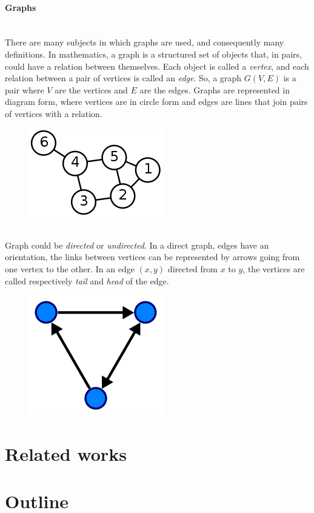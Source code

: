 \paragraph{Graphs}\
\\
There are many subjects in which graphs are used, and consequently many definitions. In mathematics, a graph is a structured set of objects that, in pairs, could have a relation between themselves. Each object is called a \textit{vertex}, and each relation between a pair of vertices is called an \textit{edge}. So, a graph $ G(V,E) $ is a pair where $ V $ are the vertices and $ E $ are the edges. Graphs are represented in diagram form, where vertices are in circle form and edges are lines that join pairs of vertices with a relation.
\begin{figure}[htbp]
	\centering
	\includegraphics[scale=0.5]{Immagini/220px-6n-graf.svg.png}
	\caption{\label{fig:diagram}}
\end{figure}
\\
Graph could be \textit{directed} or \textit{undirected}. In a direct graph, edges have an orientation, the links between vertices can be represented by arrows going from one vertex to the other. In an edge $ (x,y) $ directed from $ x $ to $ y $, the vertices are called respectively \textit{tail} and \textit{head} of the edge.
\begin{figure}[htbp]
	\centering
	\includegraphics[scale=0.5]{Immagini/220px-Directed.svg.png}
	\caption{\label{fig:diagram2}}
\end{figure}


\section{Related works}
\section{Outline}